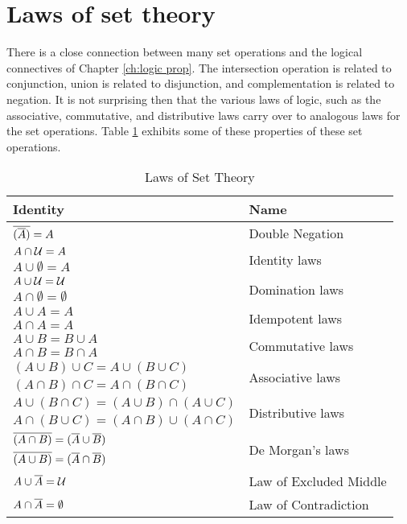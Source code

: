 \section{Laws of set theory}
There is a close connection between many set operations and the logical connectives
of Chapter \ref{ch:logic prop}.  The intersection operation is related to conjunction, union is related to disjunction, 
and complementation is related to negation. It is not surprising then  that the various laws of
logic, such as the associative, commutative, and distributive laws carry over to analogous
laws for the set operations. Table  \ref{tbl:laws set th}
exhibits some of these properties of these set operations. 

\begin{table}
\begin{tabular}{ll}
 \toprule
 \textbf{Identity}  & \textbf{Name}  \\ 
 \midrule
 \addlinespace
 $\overline{(\overline{A})}= A$ &Double Negation  \\ 
 \addlinespace
 $A\cap {\cal {U}} = A$ & \multirow{2}{*}{Identity laws}  \\ 
 $A\cup \emptyset = A$ &   \\ 
 \addlinespace 
 $A\cup {\cal {U}} = {\cal {U}}$ & \multirow{2}{*}{Domination laws} \\ 
 $A\cap \emptyset = \emptyset$ &  \\ 
 \addlinespace
 $A\cup A = A$ & \multirow{2}{*}{Idempotent laws} \\ 
 \hbox{$A\cap A= A$} &  \\ 
 \addlinespace
 $A\cup B = B\cup A$ & \multirow{2}{*}{Commutative laws} \\ 
 $A\cap B = B\cap A$ &  \\ 
 \addlinespace
 $(A\cup B)\cup C = A\cup (B\cup C)$ & \multirow{2}{*}{Associative laws} \\ 
 $(A\cap B)\cap C= A\cap (B\cap C)$ &  \\ 
 \addlinespace
 $A\cup (B\cap C)= (A\cup B)\cap (A\cup C)$ & \multirow{2}{*}{Distributive laws}  \\ 
 $A\cap (B\cup C) = (A\cap B) \cup (A\cap C)$ &  \\ 
 \addlinespace
 $\overline{(A\cap B)} = (\overline{A}\cup \overline{B})$  & \multirow{2}{*}{De Morgan's laws}  \\ 
 $\overline{(A\cup B)} = (\overline{A} \cap \overline{B})$ &  \\ 
 \addlinespace
 $A\cup \overline{A} = {\cal {U}}$   & Law of Excluded Middle  \\ 
 $A\cap \overline{A} = \emptyset$ & Law of Contradiction  \\ 
 \bottomrule
\end{tabular}
\caption{Laws of Set Theory}
\label{tbl:laws set th}
\end{table}

